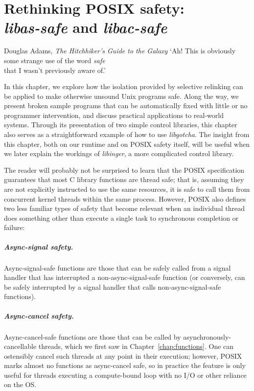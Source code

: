 \chapter{Rethinking POSIX safety: \\ \textit{libas-safe} and \textit{libac-safe}}
\label{chap:safety}

\ifdefined\chapquotes
\vspace{-1in}
\begin{chapquote}[1.75in]{Douglas Adams, \textit{The Hitchhiker's Guide to the Galaxy}}
`Ah!  This is obviously some strange use of the word \textit{safe} \\
that I wasn't previously aware of.'
\end{chapquote}
\fi

In this chapter, we explore how the isolation provided by selective relinking can be
applied to make otherwise unsound Unix programs safe.  Along the way, we present
broken sample programs that can be automatically fixed with little or no programmer
intervention, and
discuss practical applications to real-world systems.  Through its presentation
of two simple control libraries, this chapter also serves as a straightforward
example of how to use \textit{libgotcha}.  The insight from this chapter, both on our
runtime and on POSIX safety itself, will be useful when we later explain the workings
of \textit{libinger}, a more complicated control library.

The reader will probably not be surprised to learn that the POSIX specification
guarantees that most C library functions are thread safe; that is, assuming they are
not explicitly instructed to use the same resources, it is safe to call them from
concurrent kernel threads within the same process.  However, POSIX also defines two
less familiar types of safety that become relevant when an individual thread does
something other than execute a single task to synchronous completion or failure:

\paragraph{Async-signal safety.}
Async-signal-safe functions are those that can be safely called from a signal handler
that has interrupted a non-async-signal-safe function (or conversely, can be safely
interrupted by a signal handler that calls non-async-signal-safe functions).

\begin{sloppypar}
\paragraph{Async-cancel safety.}
Async-cancel-safe functions are those that can be called by
asynchronously-cancellable threads, which we first saw in
Chapter~\ref{chap:functions}.  One can ostensibly cancel such threads at any point in
their execution; however, POSIX marks almost no functions as async-cancel safe, so in
practice the feature is only useful for threads executing a compute-bound loop with
no I/O or other reliance on the OS.
\\
\end{sloppypar}

